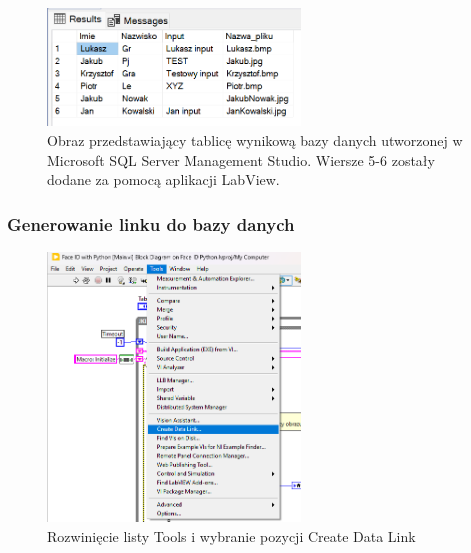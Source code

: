\documentclass{report}
\begin{document}
\begin{figure}[H]
    \centering
    \includegraphics[width=0.6\textwidth]{src/Database/Microsoft SQL.png}
    \caption{Obraz przedstawiający tablicę wynikową bazy danych utworzonej w Microsoft SQL Server Management Studio. Wiersze 5-6 zostały dodane za pomocą aplikacji LabView.}
    \label{fig:first-att}
\end{figure}


\subsubsection{\large Generowanie linku do bazy danych}

\begin{figure}[H]
    \centering
    \includegraphics[width=0.6\textwidth]{src/Database/Stage1.png}
    \caption{Rozwinięcie listy Tools i wybranie pozycji Create Data Link}
    \label{fig:first-att}
\end{figure}
\end{document}
